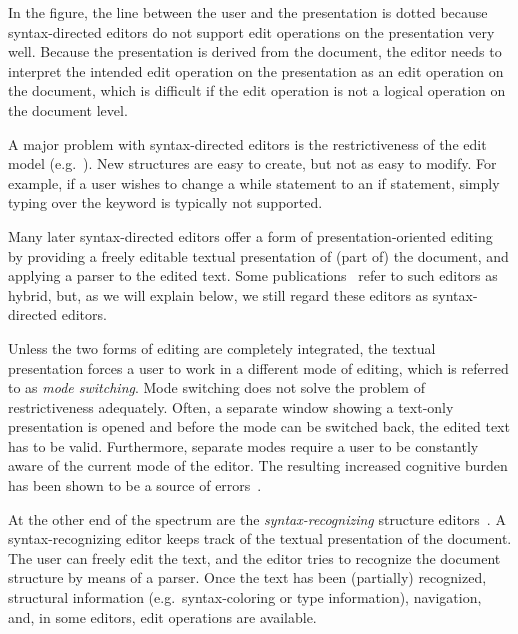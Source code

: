 \documentclass{speauth}
\begin{document}
In the figure, the line between the user and the presentation is dotted because syntax-directed editors do not support edit operations on the presentation very well. Because the presentation is derived from the document, the editor needs to interpret the intended edit operation on the presentation as an edit operation on the document, which is difficult if the edit operation is not a logical operation on the document level.

A major problem with syntax-directed editors is the restrictiveness of the edit model (e.g.~\cite{vanter94practical,rubinNeal87design}). New structures are easy to create, but not as easy to modify. For example, if a user wishes to change a while statement to an if statement, simply typing over the keyword is typically not supported. 

Many later syntax-directed editors offer a form of presentation-oriented editing by providing a freely editable textual presentation of (part of) the document, and applying a parser to the edited text. Some publications~\cite{teitelbaum81progSynth, minor90editing} refer to such editors as hybrid, but, as we will explain below, we still regard these editors as syntax-directed editors. 

Unless the two forms of editing are completely integrated, the textual presentation forces a user to work in a different mode of editing, which is referred to as {\em mode switching}. Mode switching does not solve the problem of restrictiveness adequately. Often, a separate window showing a text-only presentation is opened and before the mode can be switched back, the edited text has to be valid. Furthermore, separate modes require a user to be constantly aware of the current mode of the editor. The resulting increased cognitive burden has been shown to be a source of errors~\cite{sellen90modes}.


At the other end of the spectrum are the {\em syntax-recognizing} structure editors~\cite{budinsky85sre, ballance92pan}. A syntax-recognizing editor keeps track of the textual presentation of the document. The user can freely edit the text, and the editor tries to recognize the document structure by means of a parser. Once the text has been (partially) recognized, structural information (e.g.\ syntax-coloring or type information), navigation, and, in some editors, edit operations are available.
\end{document}
